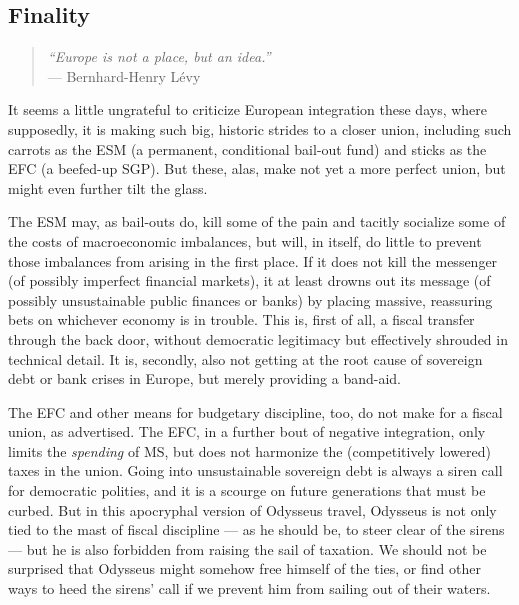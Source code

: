 \subsection[Finality]{Finality}

\begin{quote}
	\emph{``Europe is not a place, but an idea.''} \\ %
	--- Bernhard-Henry L\'{e}vy
\end{quote}

It seems a little ungrateful to criticize European integration these days, where supposedly, it is making such big, historic strides to a closer union, including such carrots as the \gls{ESM} (a permanent, conditional bail-out fund) and sticks as the \gls{EFC} (a beefed-up \gls{SGP}).
But these, alas, make not yet a more perfect union, but might even further tilt the glass.

The \gls{ESM} may, as bail-outs do, kill some of the pain and tacitly socialize some of the costs of macroeconomic imbalances, but will, in itself, do little to prevent those imbalances from arising in the first place.
If it does not kill the messenger (of possibly imperfect financial markets), it at least drowns out its message (of possibly unsustainable public finances or banks) by placing massive, reassuring bets on whichever economy is in trouble.
This is, first of all, a fiscal transfer through the back door, without democratic legitimacy but effectively  shrouded in technical detail.
It is, secondly, also not getting at the root cause of sovereign debt or bank crises in Europe, but merely providing a band-aid.

The \gls{EFC} and other means for budgetary discipline, too, do not make for a fiscal union, as advertised.
The \gls{EFC}, in a further bout of negative integration, only limits the \emph{spending} of \gls{MS}, but does not harmonize the (competitively lowered) taxes in the union.
Going into unsustainable sovereign debt is always a siren call for democratic polities, and it is a scourge on future generations that must be curbed.
But in this apocryphal version of Odysseus travel, Odysseus is not only tied to the mast of fiscal discipline --- as he should be, to steer clear of the sirens --- but he is also forbidden from raising the sail of taxation.
We should not be surprised that Odysseus might somehow free himself of the ties, or find other ways to heed the sirens' call if we prevent him from sailing out of their waters.

